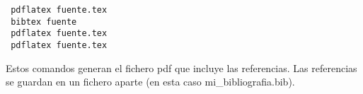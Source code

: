 \documentclass{esannV2}
\begin{document}
\begin{lstlisting}
 pdflatex fuente.tex
 bibtex fuente
 pdflatex fuente.tex
 pdflatex fuente.tex
\end{lstlisting}

Estos comandos generan el fichero pdf que incluye las referencias. Las
referencias se guardan en un fichero aparte (en esta caso mi\_bibliografia.bib).

\begin{footnotesize}

%
%
%
%
%





\end{footnotesize}

\end{document}
